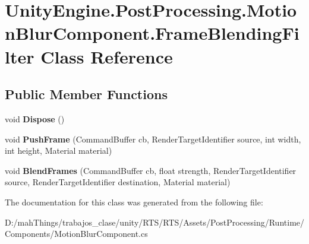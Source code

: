 \hypertarget{class_unity_engine_1_1_post_processing_1_1_motion_blur_component_1_1_frame_blending_filter}{}\section{Unity\+Engine.\+Post\+Processing.\+Motion\+Blur\+Component.\+Frame\+Blending\+Filter Class Reference}
\label{class_unity_engine_1_1_post_processing_1_1_motion_blur_component_1_1_frame_blending_filter}
\subsection*{Public Member Functions}
\begin{DoxyCompactItemize}
\item 
\mbox{\label{class_unity_engine_1_1_post_processing_1_1_motion_blur_component_1_1_frame_blending_filter_a65d54ba8a2c251750ae6f0b24b820dea}} 
void {\bfseries Dispose} ()
\item 
\mbox{\label{class_unity_engine_1_1_post_processing_1_1_motion_blur_component_1_1_frame_blending_filter_a28f61022ba58cd83c34e46a2511c32ed}} 
void {\bfseries Push\+Frame} (Command\+Buffer cb, Render\+Target\+Identifier source, int width, int height, Material material)
\item 
\mbox{\label{class_unity_engine_1_1_post_processing_1_1_motion_blur_component_1_1_frame_blending_filter_a679383bc1fc3e5e698bb5724676efcc5}} 
void {\bfseries Blend\+Frames} (Command\+Buffer cb, float strength, Render\+Target\+Identifier source, Render\+Target\+Identifier destination, Material material)
\end{DoxyCompactItemize}


The documentation for this class was generated from the following file\+:\begin{DoxyCompactItemize}
\item 
D\+:/mah\+Things/trabajos\+\_\+clase/unity/\+R\+T\+S/\+R\+T\+S/\+Assets/\+Post\+Processing/\+Runtime/\+Components/Motion\+Blur\+Component.\+cs\end{DoxyCompactItemize}
